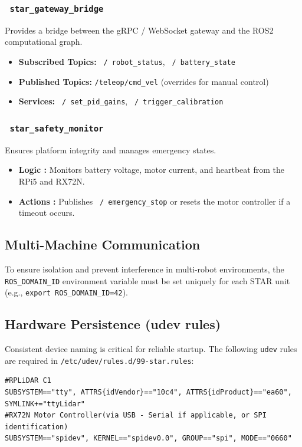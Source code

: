     \subsubsection{\texttt { star\_gateway\_bridge}
   }
    Provides a bridge between the gRPC /
        WebSocket gateway and the ROS2 computational graph.
\begin{itemize}
    \item \textbf{Subscribed Topics:}
    \texttt{ / robot\_status}, \texttt { / battery\_state}
    \item \textbf{Published Topics:} \texttt{/teleop/cmd\_vel} (overrides for manual control)
    \item \textbf{Services:
   }
    \texttt{ / set\_pid\_gains}, \texttt { / trigger\_calibration}
    \end{itemize}

    \subsubsection{\texttt { star\_safety\_monitor}
   }
    Ensures platform integrity and manages emergency states.
\begin{itemize}
    \item \textbf{Logic :} Monitors battery voltage, motor current,
        and heartbeat from the RPi5 and RX72N.
    \item \textbf{Actions :} Publishes \texttt{ / emergency\_stop} or
            resets the motor controller if a timeout occurs.
\end{itemize}

\subsection{Multi-Machine Communication}

To ensure isolation and prevent interference in multi-robot environments, the \texttt{ROS\_DOMAIN\_ID} environment variable must be set uniquely for each STAR unit (e.g., \texttt{export ROS\_DOMAIN\_ID=42}). 

\subsection{Hardware Persistence (udev rules)}

Consistent device naming is critical for reliable startup. The following \texttt{udev} rules are required in \texttt{/etc/udev/rules.d/99-star.rules}:

\begin{verbatim}
#RPLiDAR C1
SUBSYSTEM=="tty", ATTRS{idVendor}=="10c4", ATTRS{idProduct}=="ea60", SYMLINK+="ttyLidar"
#RX72N Motor Controller(via USB - Serial if applicable, or SPI identification)
SUBSYSTEM=="spidev", KERNEL=="spidev0.0", GROUP=="spi", MODE=="0660"
\end{verbatim}


